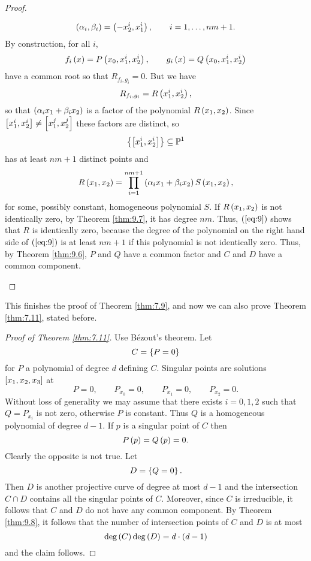 \begin{proof}
\begin{enumerate}
$$ \rb{\alpha_i, \beta_i} = \rb{-x_2^i, x_1^i}, \qquad i = 1, \dots, nm + 1. $$
By construction, for all $ i $,
$$ f_i\rb{x} = P\rb{x_0, x_1^i, x_2^i}, \qquad g_i\rb{x} = Q\rb{x_0, x_1^i, x_2^i} $$
have a common root so that $ R_{f_i, g_i} = 0 $. But we have
$$ R_{f_i, g_i} = R\rb{x_1^i, x_2^i}, $$
so that $ \rb{\alpha_ix_1 + \beta_ix_2} $ is a factor of the polynomial $ R\rb{x_1, x_2} $. Since $ \sb{x_1^i, x_2^i} \ne \sb{x_1^j, x_2^j} $ these factors are distinct, so
$$ \cb{\sb{x_1^i, x_2^i}} \subseteq \P^1 $$
has at least $ nm + 1 $ distinct points and
\begin{equation}
\label{eq:9}
R\rb{x_1, x_2} = \prod_{i = 1}^{nm + 1} \rb{\alpha_ix_1 + \beta_ix_2}S\rb{x_1, x_2},
\end{equation}
for some, possibly constant, homogeneous polynomial $ S $. If $ R\rb{x_1, x_2} $ is not identically zero, by Theorem \ref{thm:9.7}, it has degree $ nm $. Thus, $ \rb{\ref{eq:9}} $ shows that $ R $ is identically zero, because the degree of the polynomial on the right hand side of $ \rb{\ref{eq:9}} $ is at least $ nm + 1 $ if this polynomial is not identically zero. Thus, by Theorem \ref{thm:9.6}, $ P $ and $ Q $ have a common factor and $ C $ and $ D $ have a common component.
\end{enumerate}
\end{proof}

This finishes the proof of Theorem \ref{thm:7.9}, and now we can also prove Theorem \ref{thm:7.11}, stated before.

\begin{proof}[Proof of Theorem \ref{thm:7.11}]
Use B\'ezout's theorem. Let
$$ C = \cb{P = 0} $$
for $ P $ a polynomial of degree $ d $ defining $ C $. Singular points are solutions $ \sb{x_1, x_2, x_3} $ at
$$ P = 0, \qquad P_{x_0} = 0, \qquad P_{x_1} = 0, \qquad P_{x_2} = 0. $$
Without loss of generality we may assume that there exists $ i = 0, 1, 2 $ such that $ Q = P_{x_i} $ is not zero, otherwise $ P $ is constant. Thus $ Q $ is a homogeneous polynomial of degree $ d - 1 $. If $ p $ is a singular point of $ C $ then
$$ P\rb{p} = Q\rb{p} = 0. $$
Clearly the opposite is not true. Let
$$ D = \cb{Q = 0}. $$
Then $ D $ is another projective curve of degree at most $ d - 1 $ and the intersection $ C \cap D $ contains all the singular points of $ C $. Moreover, since $ C $ is irreducible, it follows that $ C $ and $ D $ do not have any common component. By Theorem \ref{thm:9.8}, it follows that the number of intersection points of $ C $ and $ D $ is at most
$$ \deg\rb{C}\deg\rb{D} = d \cdot \rb{d - 1} $$
and the claim follows.
\end{proof}

